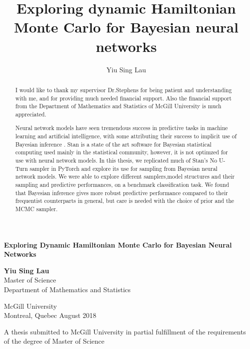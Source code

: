 \documentclass[12pt]{report}
\title{Exploring dynamic Hamiltonian Monte Carlo for Bayesian neural networks}
\author{Yiu Sing Lau}
\date{}
\begin{document}
\begin{titlepage}
    \begin{center}
        \vspace*{1cm}
        \Large
        \textbf{Exploring Dynamic Hamiltonian Monte Carlo for Bayesian Neural Networks}
        \normalsize
         
        \vspace{1.5cm}
        
        \textbf{Yiu Sing Lau} \\
        Master of Science \\
        Department of Mathematics and Statistics 
        
        \vspace{1.5cm}
        McGill University \\
        Montreal, Quebec
        August 2018

        
        \vfill
        
        A thesis submitted to McGill University in partial fulfillment of the requirements of  the degree of Master of Science\\
        
        \vspace{0.8cm}
        
        
        
        
        
    \end{center}
\end{titlepage}

\renewcommand{\abstractname}{ACKNOWLEDGEMENTS}
\begin{abstract}
I would like to thank my supervisor Dr.Stephens for being patient and understanding with me, and for providing much needed financial support. Also the financial support from the Department of Mathematics and Statistics of McGill University is much appreciated.
\end{abstract}

\renewcommand{\abstractname}{ABSTRACT}

\begin{abstract}
Neural network models have seen tremendous success in predictive tasks in machine learning and artificial intelligence, with some attributing their success to implicit use of Bayesian inference \cite{mandt2017stochastic}. Stan is a state of the art software for Bayesian statistical computing used mainly in the statistical community, however, it is not optimzed for use with neural network models. In this thesis, we replicated much of Stan's No U-Turn sampler in PyTorch and explore its use for sampling from Bayesian neural network models. We were able to explore different samplers,model structures and their sampling and predictive performances, on a benchmark classification task. We found that Bayesian inference gives more robust predictive performance compared to their frequentist counterparts in general, but care is needed with the choice of prior and the MCMC sampler. 

\end{abstract}
\tableofcontents 
\end{document}
